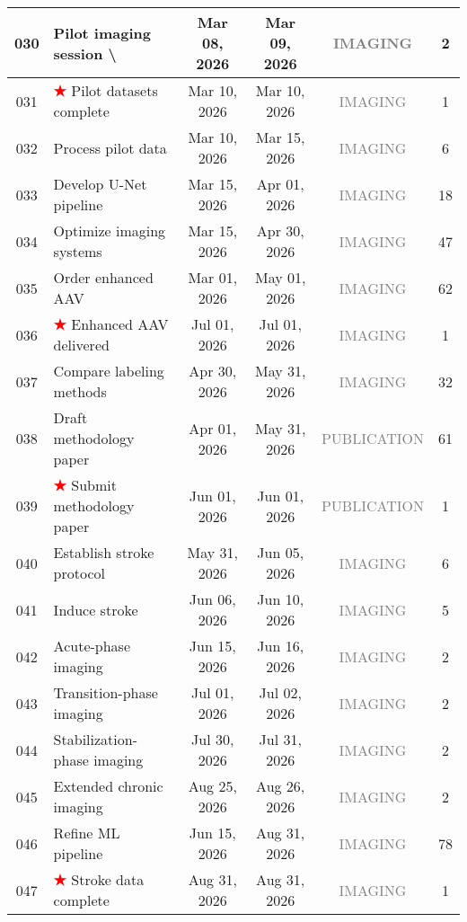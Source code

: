 \documentclass[portrait,a4paper]{article}
\begin{document}
\begin{longtable}{|c|p{}|c|c|c|c|}
\hline
030 & Pilot imaging session \textbackslash{}#3 & Mar 08, 2026 & Mar 09, 2026 & \textcolor{gray}{IMAGING} & 2 \\
\hline
031 & \textcolor{red}{\textbf{★}} Pilot datasets complete & Mar 10, 2026 & Mar 10, 2026 & \textcolor{gray}{IMAGING} & 1 \\
\hline
032 & Process pilot data & Mar 10, 2026 & Mar 15, 2026 & \textcolor{gray}{IMAGING} & 6 \\
\hline
033 & Develop U-Net pipeline & Mar 15, 2026 & Apr 01, 2026 & \textcolor{gray}{IMAGING} & 18 \\
\hline
034 & Optimize imaging systems & Mar 15, 2026 & Apr 30, 2026 & \textcolor{gray}{IMAGING} & 47 \\
\hline
035 & Order enhanced AAV & Mar 01, 2026 & May 01, 2026 & \textcolor{gray}{IMAGING} & 62 \\
\hline
036 & \textcolor{red}{\textbf{★}} Enhanced AAV delivered & Jul 01, 2026 & Jul 01, 2026 & \textcolor{gray}{IMAGING} & 1 \\
\hline
037 & Compare labeling methods & Apr 30, 2026 & May 31, 2026 & \textcolor{gray}{IMAGING} & 32 \\
\hline
038 & Draft methodology paper & Apr 01, 2026 & May 31, 2026 & \textcolor{gray}{PUBLICATION} & 61 \\
\hline
039 & \textcolor{red}{\textbf{★}} Submit methodology paper & Jun 01, 2026 & Jun 01, 2026 & \textcolor{gray}{PUBLICATION} & 1 \\
\hline
040 & Establish stroke protocol & May 31, 2026 & Jun 05, 2026 & \textcolor{gray}{IMAGING} & 6 \\
\hline
041 & Induce stroke & Jun 06, 2026 & Jun 10, 2026 & \textcolor{gray}{IMAGING} & 5 \\
\hline
042 & Acute-phase imaging & Jun 15, 2026 & Jun 16, 2026 & \textcolor{gray}{IMAGING} & 2 \\
\hline
043 & Transition-phase imaging & Jul 01, 2026 & Jul 02, 2026 & \textcolor{gray}{IMAGING} & 2 \\
\hline
044 & Stabilization-phase imaging & Jul 30, 2026 & Jul 31, 2026 & \textcolor{gray}{IMAGING} & 2 \\
\hline
045 & Extended chronic imaging & Aug 25, 2026 & Aug 26, 2026 & \textcolor{gray}{IMAGING} & 2 \\
\hline
046 & Refine ML pipeline & Jun 15, 2026 & Aug 31, 2026 & \textcolor{gray}{IMAGING} & 78 \\
\hline
047 & \textcolor{red}{\textbf{★}} Stroke data complete & Aug 31, 2026 & Aug 31, 2026 & \textcolor{gray}{IMAGING} & 1 \\

\end{longtable}
\end{document}
